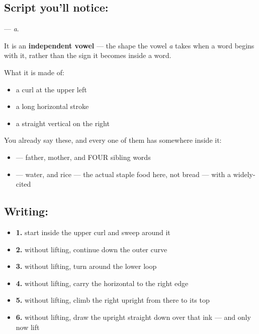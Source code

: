 \subsection*{Script you'll notice: }
\textbf{} — \emph{a}.

It is an \textbf{independent vowel} — the shape the vowel \emph{a} takes when a word begins with it, rather than the sign it becomes inside a word.

What it is made of:

\begin{itemize}
\raggedright
  \item a curl at the upper left
  \item a long horizontal stroke
  \item a straight vertical on the right
\end{itemize}

You already say these, and every one of them has  somewhere inside it:

\begin{itemize}
\raggedright
  \item \textbf{     } — father, mother, and FOUR sibling words
  \item \textbf{  } — water, and rice — the actual staple food here, not bread — with a widely-cited
\end{itemize}

\subsection*{Writing: }

\begin{itemize}
\raggedright
  \item \textbf{1.} start inside the upper curl and sweep around it
  \item \textbf{2.} without lifting, continue down the outer curve
  \item \textbf{3.} without lifting, turn around the lower loop
  \item \textbf{4.} without lifting, carry the horizontal to the right edge
  \item \textbf{5.} without lifting, climb the right upright from there to its top
  \item \textbf{6.} without lifting, draw the upright straight down over that ink — and only now lift
\end{itemize}

